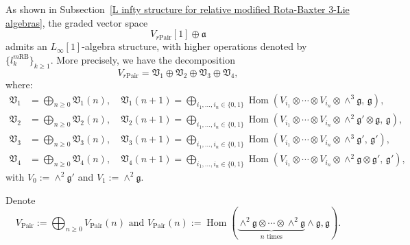 \documentclass[12pt]{amsart}
\theoremstyle{definition}
\begin{document}
As shown in Subsection~\ref{L infty  structure for relative  modified Rota-Baxter 3-Lie algebras}, the graded vector space
\[
V_{r\mathrm{Pair}}[1] \oplus \mathfrak{a}
\]
admits an $L_\infty[1]$-algebra structure, with higher operations denoted by $\{l^{m\mathrm{RB}}_k\}_{k \geq 1}$. More precisely, we have the decomposition
\[
V_{r\mathrm{Pair}} = \mathfrak{V}_1 \oplus \mathfrak{V}_2 \oplus \mathfrak{V}_3 \oplus \mathfrak{V}_4,
\]
where:
\begin{align*}
	\mathfrak{V}_1 &= \bigoplus_{n \geq 0} \mathfrak{V}_1(n), \quad
	\mathfrak{V}_1(n+1) = \bigoplus_{i_1, \ldots, i_n \in \{0,1\}}
	\operatorname{Hom}\left(V_{i_1} \otimes \cdots \otimes V_{i_n} \otimes \wedge^3\mathfrak{g},\, \mathfrak{g} \right), \\
	\mathfrak{V}_2 &= \bigoplus_{n \geq 0} \mathfrak{V}_2(n), \quad
	\mathfrak{V}_2(n+1) = \bigoplus_{i_1, \ldots, i_n \in \{0,1\}}
	\operatorname{Hom}\left(V_{i_1} \otimes \cdots \otimes V_{i_n} \otimes \wedge^2\mathfrak{g}' \otimes \mathfrak{g},\, \mathfrak{g} \right), \\
	\mathfrak{V}_3 &= \bigoplus_{n \geq 0} \mathfrak{V}_3(n), \quad
	\mathfrak{V}_3(n+1) = \bigoplus_{i_1, \ldots, i_n \in \{0,1\}}
	\operatorname{Hom}\left(V_{i_1} \otimes \cdots \otimes V_{i_n} \otimes \wedge^3\mathfrak{g}',\, \mathfrak{g}' \right), \\
	\mathfrak{V}_4 &= \bigoplus_{n \geq 0} \mathfrak{V}_4(n), \quad
	\mathfrak{V}_4(n+1) = \bigoplus_{i_1, \ldots, i_n \in \{0,1\}}
	\operatorname{Hom}\left(V_{i_1} \otimes \cdots \otimes V_{i_n} \otimes \wedge^2\mathfrak{g} \otimes \mathfrak{g}',\, \mathfrak{g}' \right),
\end{align*}
with $V_0 := \wedge^2\mathfrak{g}'$ and $V_1 := \wedge^2\mathfrak{g}$.




Denote
\[
V_{\mathrm{Pair}} :=\bigoplus_{n \geq 0}V_{\mathrm{Pair}}(n) \text{ and } V_{\mathrm{Pair}}(n):= \operatorname{Hom}\left(\underbrace{\wedge^2 \mathfrak{g} \otimes \cdots \otimes \wedge^2 \mathfrak{g}}_{n \text{ times}} \wedge \mathfrak{g}, \mathfrak{g}\right).
\]
\end{document}
